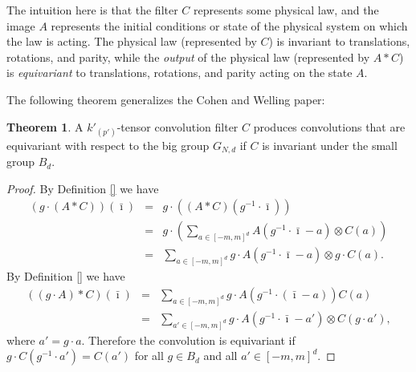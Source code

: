 \documentclass{article}
\theoremstyle{definition}
\newtheorem{theorem}{Theorem}
\newcommand{\tensorname}[2]{{#1}_{(#2)}}
\newcommand{\tensor}[2]{$\tensorname{#1}{#2}$-tensor}
\begin{document}
The intuition here is that the filter $C$ represents some physical law, and the image $A$ represents the initial conditions or state of the physical system on which the law is acting.
The physical law (represented by $C$) is invariant to translations, rotations, and parity, while the \emph{output} of the physical law (represented by $A\ast C$) is \emph{equivariant} to translations, rotations, and parity acting on the state $A$.

The following theorem generalizes the Cohen and Welling paper:

\begin{theorem}
A \tensor{k'}{p'} convolution filter $C$ produces convolutions that are equivariant with respect to the big group $G_{N,d}$ if $C$ is invariant under the small group $B_d$.
\end{theorem}

\begin{proof}
By Definition \ref{} we have
\begin{eqnarray}
(g\cdot (A* C) )(\bar \imath) &=& g\cdot( (A*C)(g^{-1} \cdot \bar \imath)) \\
&=& g \cdot \left (\sum_{a\in [-m,m]^d} A(g^{-1}\cdot \bar \imath - a) \otimes C(a)\right)\\
&=& \sum_{a\in [-m,m]^d} g \cdot A(g^{-1} \cdot \bar \imath -a ) \otimes g \cdot C(a).
\end{eqnarray}
By Definition \ref{} we have
\begin{eqnarray}
((g\cdot A)* C) (\bar \imath) &=& \sum_{a\in [-m,m]^d} g\cdot A(g^{-1} \cdot (\bar \imath - a) ) C(a) \\
&=& \sum_{a'\in [-m,m]^d} g \cdot A(g^{-1}\cdot \bar \imath -a') \otimes C(g\cdot a'),
\end{eqnarray}
where $a'=g\cdot a$. Therefore the convolution is equivariant if $g\cdot C(g^{-1} \cdot a') = C(a')$ for all $g\in B_d$ and all $a' \in [-m,m]^d$. 
\end{proof}
\end{document}
